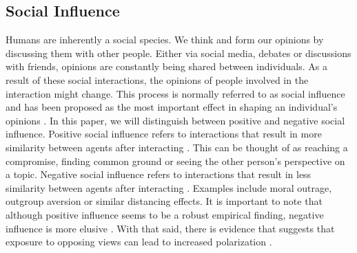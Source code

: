 \documentclass{article}
\begin{document}
\subsection{Social Influence}
Humans are inherently a social species. We think and form our opinions by discussing them with other people. 
Either via social media, debates or discussions with friends, opinions are constantly being shared between individuals. 
As a result of these social interactions, the opinions of people involved in the interaction might change. 
This process is normally referred to as social influence and has been proposed as the most important effect in shaping an individual’s opinions \cite{chacoma_opinion_2015}. 
In this paper, we will distinguish between positive and negative social influence. Positive social influence refers to interactions that result in more similarity between agents after interacting \cite{flache_models_2017,levin_dynamics_2021}. 
This can be thought of as reaching a compromise, finding common ground or seeing the other person’s perspective on a topic. Negative social influence refers to interactions that result in less similarity between agents after interacting \cite{flache_models_2017}. 
Examples include moral outrage, outgroup aversion or similar distancing effects. It is important to note that although positive influence seems to be a robust empirical finding, negative influence is more elusive \cite{flache_models_2017,takacs_is_2014,turner_paths_2018}. 
With that said, there is evidence that suggests that exposure to opposing views can lead to increased polarization \cite{bail_exposure_2018}.
\end{document}
